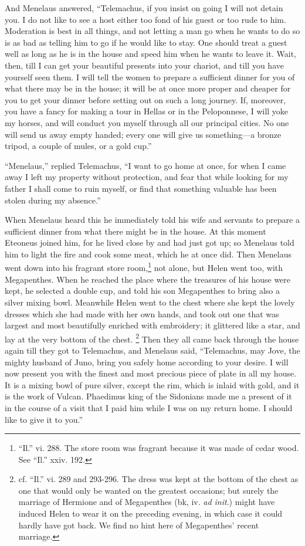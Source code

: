 And Menelaus answered, “Telemachus, if you insist on going I will not detain
you. I do not like to see a host either too fond of his guest or too rude to
him. Moderation is best in all things, and not letting a man go when he wants
to do so is as bad as telling him to go if he would like to stay. One should
treat a guest well as long as he is in the house and speed him when he wants to
leave it. Wait, then, till I can get your beautiful presents into your chariot,
and till you have yourself seen them. I will tell the women to prepare a
sufficient dinner for you of what there may be in the house; it will be at once
more proper and cheaper for you to get your dinner before setting out on such a
long journey. If, moreover, you have a fancy for making a tour in Hellas or in
the Peloponnese, I will yoke my horses, and will conduct you myself through all
our principal cities. No one will send us away empty handed; every one will
give us something—a bronze tripod, a couple of mules, or a gold cup.”

“Menelaus,” replied Telemachus, “I want to go home at once, for when I came
away I left my property without protection, and fear that while looking for my
father I shall come to ruin myself, or find that something valuable has been
stolen during my absence.”

When Menelaus heard this he immediately told his wife and servants to prepare a
sufficient dinner from what there might be in the house. At this moment
Eteoneus joined him, for he lived close by and had just got up; so Menelaus
told him to light the fire and cook some meat, which he at once did. Then
Menelaus went down into his fragrant store room,\footnote{“Il.” vi. 288. The store room was fragrant because it was made of cedar
wood. See “Il.” xxiv. 192.} not alone, but Helen went too, with
Megapenthes. When he reached the place where the treasures of his house were
kept, he selected a double cup, and told his son Megapenthes to bring also a
silver mixing bowl. Meanwhile Helen went to the chest where she kept the lovely
dresses which she had made with her own hands, and took out one that was
largest and most beautifully enriched with embroidery; it glittered like a
star, and lay at the very bottom of the chest. \footnote{cf. “Il.” vi. 289 and 293-296. The dress was kept at the bottom of the chest
as one that would only be wanted on the greatest occasions; but surely the
marriage of Hermione and of Megapenthes (bk, iv. \emph{ad init}.) might have
induced Helen to wear it on the preceding evening, in which case it could
hardly have got back. We find no hint here of Megapenthes’ recent marriage.} Then they all came back through the
house again till they got to Telemachus, and Menelaus said, “Telemachus, may
Jove, the mighty husband of Juno, bring you safely home according to your
desire. I will now present you with the finest and most precious piece of plate
in all my house. It is a mixing bowl of pure silver, except the rim, which is
inlaid with gold, and it is the work of Vulcan. Phaedimus king of the Sidonians
made me a present of it in the course of a visit that I paid him while I was on
my return home. I should like to give it to you.”

